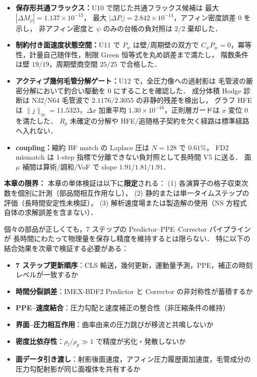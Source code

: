 \begin{tcolorbox}[resultbox, title={U1--U12 単体検証の総括}]
\begin{itemize}[noitemsep]
  \item \textbf{保存形共通フラックス：}U10 で閉じた共通フラックス候補は
        最大 $|\Delta M_\rho|=1.137\times10^{-13}$，
        最大 $|\Delta P_i|=2.842\times10^{-14}$，アフィン密度誤差 $0$ を示し，
        非アフィン密度と $\psi$ のみの台帳の負対照は $2/2$ 棄却した．
  \item \textbf{制約付き面速度状態空間：}U11 で $P_w$ は壁/周期壁の双方で
        $C_wP_w=0$，冪等性，計量自己随伴性，制限 Green 恒等式を丸め誤差まで満たし，
        階数条件は壁 $19/19$，周期壁商空間 $25/25$ で合格した．
  \item \textbf{アクティブ幾何毛管分解ゲート：}U12 で，全圧力像への過射影は
        毛管波の厳密分解において釣合い駆動を $0$ にすることを確認した．
        成分体積 Hodge 診断は N32/N64 毛管波で $2.1176/2.3055$ の非静的残差を検出し，
        グラフ HFE は $\|j\|_\infty=11.5323$，$\Delta x$ 加重平均
        $1.30\times10^{-16}$，正則層ガードは $x$ 変位 $0$ を満たした．
        $R_p$ 未確定の分解や HFE/追随格子契約を欠く経路は標準経路へ入れない．
  \item \textbf{coupling：}縮約 BF match の Laplace 圧は $N=128$ で $0.61\%$，
        FD2 mismatch は 1-step 指標で分離できない負対照として長時間 V5 に送る．
        面 $\mu$ 補間は算術/調和/VoF で slope $1.91/1.81/1.91$．
\end{itemize}
\end{tcolorbox}

\noindent\textbf{本章の限界：}
本章の単体検証は以下に\textbf{限定}される：
(1) 各演算子の格子収束次数を個別に計測（部品間相互作用なし），
(2) 静的または単一タイムステップの評価（長時間安定性未検証），
(3) 解析速度場または製造解の使用（NS 方程式自体の求解誤差を含まない）．

個々の部品が正しくても，7 ステップの Predictor--PPE--Corrector パイプラインが
長時間にわたって物理量を保存し精度を維持するとは限らない．
特に以下の結合効果を次章で検証する必要がある：
\begin{itemize}[noitemsep]
  \item \textbf{7 ステップ更新順序}：CLS 輸送，幾何更新，運動量予測，PPE，補正の時刻レベルが一致するか
  \item \textbf{時間分裂誤差}：IMEX-BDF2 Predictor と Corrector の非対称性が蓄積するか
  \item \textbf{PPE--速度結合}：圧力勾配と速度補正の整合性（非圧縮条件の維持）
  \item \textbf{界面--圧力相互作用}：曲率由来の圧力跳びが移流と共鳴しないか
  \item \textbf{密度比依存性}：$\rho_l/\rho_g \gg 1$ で精度が劣化・発散しないか
  \item \textbf{面データ引き渡し}：射影後面速度，アフィン圧力履歴面加速度，毛管成分の圧力勾配射影が同じ面複体を共有するか
\end{itemize}


